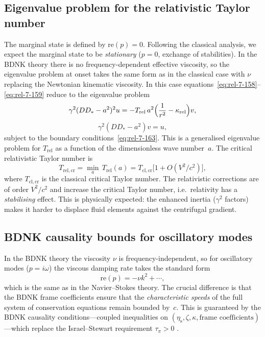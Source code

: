 \subsection{Eigenvalue problem for the relativistic Taylor
  number}\label{sec:rel-7-70e}

The marginal state is defined by $\mathrm{re}(p)=0$.  Following
the classical analysis, we expect the marginal state to be
\emph{stationary} ($p=0$, exchange of stabilities).  In the BDNK
theory there is no frequency-dependent effective viscosity, so the
eigenvalue problem at onset takes the same form as in the classical
case with $\nu$ replacing the Newtonian kinematic viscosity.  In this case
equations~\eqref{eq:rel-7-158}--\eqref{eq:rel-7-159} reduce to the
eigenvalue problem
\begin{equation}
\label{eq:rel-7-167}
\gamma^{2}(DD_{*}-a^{2})^{2}u
  = -T_{\mathrm{rel}}\,a^{2}
    \Bigl(\frac{1}{r^{2}}-\kappa_{\mathrm{rel}}\Bigr)v,
\end{equation}
\begin{equation}
\label{eq:rel-7-168}
\gamma^{2}(DD_{*}-a^{2})v = u,
\end{equation}
subject to the boundary conditions~\eqref{eq:rel-7-163}.  This is a
generalised eigenvalue problem for $T_{\mathrm{rel}}$ as a function
of the dimensionless wave number~$a$.  The critical relativistic
Taylor number is
\begin{equation}
\label{eq:rel-7-169}
T_{\mathrm{rel,cr}} = \min_{a}\,T_{\mathrm{rel}}(a)
  = T_{\mathrm{cl,cr}}
    \bigl[1+O(V^{2}/c^{2})\bigr],
\end{equation}
where $T_{\mathrm{cl,cr}}$ is the classical critical Taylor number.
The relativistic corrections are of order $V^{2}/c^{2}$ and
increase the critical Taylor number, i.e.\ relativity has a
\emph{stabilising} effect.  This is physically expected: the
enhanced inertia ($\gamma^{2}$ factors) makes it harder to displace
fluid elements against the centrifugal gradient.

\subsection{BDNK causality bounds for oscillatory
  modes}\label{sec:rel-7-70f}

In the BDNK theory the viscosity $\nu$ is frequency-independent,
so for oscillatory modes ($p=i\omega$) the viscous damping rate
takes the standard form
\begin{equation}
\label{eq:rel-7-170}
\mathrm{re}(p)
  = -\nu k^{2} + \cdots,
\end{equation}
which is the same as in the Navier--Stokes theory.  The crucial
difference is that the BDNK frame coefficients ensure that the
\emph{characteristic speeds} of the full system of conservation
equations remain bounded by~$c$.  This is guaranteed by the
BDNK causality conditions---coupled inequalities on
$(\eta_{\mathrm{s}}, \zeta, \kappa, \text{frame coefficients})$---which
replace the Israel--Stewart requirement $\tau_{\pi}>0$
\citep{BemficaDN2018,Kovtun2019}.

